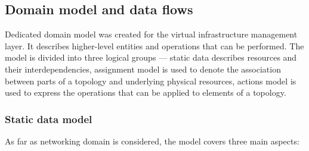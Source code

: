 \documentclass[11pt]{book}
\begin{document}
      \subsection{Domain model and data flows}
      \label{sec:domain-model}

        Dedicated domain model was created for the virtual infrastructure management layer. It describes higher-level
        entities and operations that can be performed. The model is divided into three logical groups --- static data
        describes resources and their interdependencies, assignment model is used to denote the association between
        parts of a topology and underlying physical resources, actions model is used to express the operations that can
        be applied to elements of a topology.


        \subsubsection{Static data model}

          As far as networking domain is considered, the model covers three main aspects:
\end{document}
